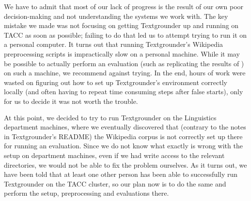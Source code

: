 \par
We have to admit that most of our lack of progress is the result of our own
poor decision-making and not understanding the systems we work with.
The key mistake we made was not focusing on getting Textgrounder up and running
on TACC as soon as possible; failing to do that led us to
attempt trying to run it on a personal computer.
It turns out that running Textgrounder's Wikipedia preprocessing scripts is
impractically slow on a personal machine. While it may be possible to actually
perform an evaluation (such as replicating the results of \cite{rolleretal:12})
on such a machine, we recommend against trying.
In the end, hours of work were wasted on figuring out how to set up
Textgrounder's environment correctly locally (and often having to repeat time consuming
steps after false starts), only for us to decide it was not worth the trouble.
\par
At this point, we decided to try to run Textgrounder on the Linguistics
department machines, where we eventually discovered that (contrary to the notes
in Textgrounder's README) the Wikipedia corpus is not correctly set up
there for running an evaluation.
Since we do not know what exactly is wrong with the setup on department machines, even if we had write
access to the relevant directories, we would not be able to fix the problem
ourselves.
As it turns out, we have been told that at least one other person
has been able to successfully run Textgrounder on the TACC cluster, so our plan
now is to do the same and perform the setup, preprocessing and evaluations there.
